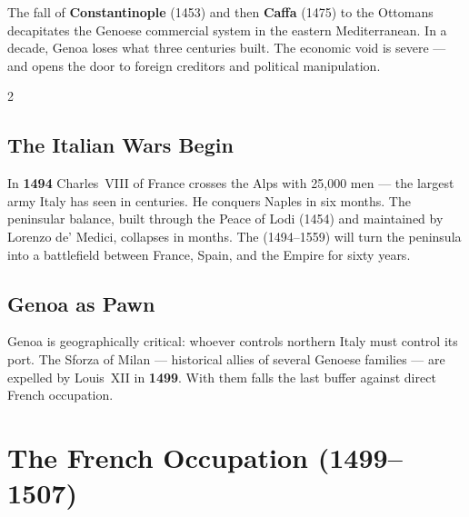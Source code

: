 The fall of \textbf{Constantinople} (1453) and then \textbf{Caffa} (1475)
to the Ottomans decapitates the Genoese commercial system in the eastern
Mediterranean. In a decade, Genoa loses what three centuries built.
The economic void is severe --- and opens the door to foreign creditors
and political manipulation.

\begin{multicols}{2}

\subsection{The Italian Wars Begin}


In \textbf{1494} Charles~VIII of France crosses the Alps with 25,000 men
--- the largest army Italy has seen in centuries. He conquers Naples in
six months. The peninsular balance, built through the Peace of Lodi (1454)
and maintained by Lorenzo de' Medici, collapses in months. The
 (1494--1559) will turn the peninsula into a
battlefield between France, Spain, and the Empire for sixty years.

\columnbreak

\subsection{Genoa as Pawn}

Genoa is geographically critical: whoever controls northern Italy must
control its port. The Sforza of Milan --- historical allies of several
Genoese families --- are expelled by Louis~XII in \textbf{1499}.
With them falls the last buffer against direct French occupation.


\end{multicols}

\section{The French Occupation (1499--1507)}
\label{sec:occupation}

